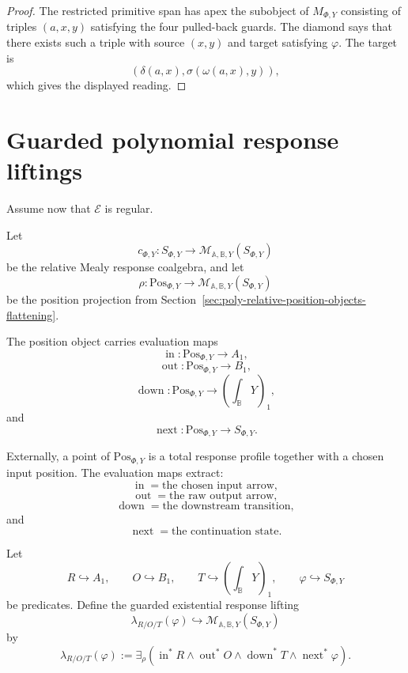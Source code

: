 \begin{proof}
The restricted primitive span has apex the subobject of \(M_{\Phi,Y}\)
consisting of triples \((a,x,y)\) satisfying the four pulled-back guards.
The diamond says that there exists such a triple with source \((x,y)\) and
target satisfying \(\varphi\).  The target is
\[
\left(
\delta(a,x),
\sigma(\omega(a,x),y)
\right),
\]
which gives the displayed reading.
\end{proof}

\section{Guarded polynomial response liftings}
\label{sec:poly-relative-guarded-response-liftings}

Assume now that \(\mathcal E\) is regular.

Let
\[
c_{\Phi,Y}:
S_{\Phi,Y}\to
\mathcal M_{\mathbb A,\mathbb B,Y}(S_{\Phi,Y})
\]
be the relative Mealy response coalgebra, and let
\[
\rho:
\mathrm{Pos}_{\Phi,Y}\to
\mathcal M_{\mathbb A,\mathbb B,Y}(S_{\Phi,Y})
\]
be the position projection from
Section~\ref{sec:poly-relative-position-objects-flattening}.

The position object carries evaluation maps
\[
\operatorname{in}:\mathrm{Pos}_{\Phi,Y}\to A_1,
\]
\[
\operatorname{out}:\mathrm{Pos}_{\Phi,Y}\to B_1,
\]
\[
\operatorname{down}:\mathrm{Pos}_{\Phi,Y}\to
\left(\int_{\mathbb B}Y\right)_1,
\]
and
\[
\operatorname{next}:\mathrm{Pos}_{\Phi,Y}\to S_{\Phi,Y}.
\]

Externally, a point of \(\mathrm{Pos}_{\Phi,Y}\) is a total response profile
together with a chosen input position.  The evaluation maps extract:
\[
\operatorname{in}=\text{the chosen input arrow},
\]
\[
\operatorname{out}=\text{the raw output arrow},
\]
\[
\operatorname{down}=\text{the downstream transition},
\]
and
\[
\operatorname{next}=\text{the continuation state}.
\]

\begin{definition}
\label{def:poly-relative-guarded-existential-lifting}
Let
\[
R\hookrightarrow A_1,
\qquad
O\hookrightarrow B_1,
\qquad
T\hookrightarrow\left(\int_{\mathbb B}Y\right)_1,
\qquad
\varphi\hookrightarrow S_{\Phi,Y}
\]
be predicates.  Define the guarded existential response lifting
\[
\lambda_{R/O/T}(\varphi)
\hookrightarrow
\mathcal M_{\mathbb A,\mathbb B,Y}(S_{\Phi,Y})
\]
by
\[
\lambda_{R/O/T}(\varphi)
:=
\exists_{\rho}
\left(
\operatorname{in}^{\ast}R
\wedge
\operatorname{out}^{\ast}O
\wedge
\operatorname{down}^{\ast}T
\wedge
\operatorname{next}^{\ast}\varphi
\right).
\]
\end{definition}

